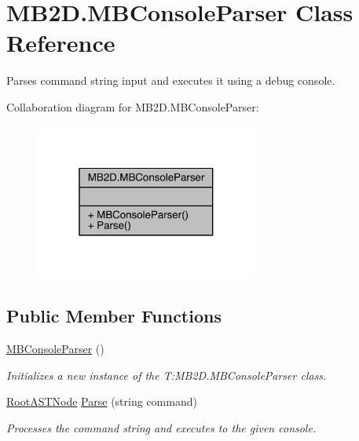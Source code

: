 \hypertarget{class_m_b2_d_1_1_m_b_console_parser}{}\section{M\+B2\+D.\+M\+B\+Console\+Parser Class Reference}
\label{class_m_b2_d_1_1_m_b_console_parser}


Parses command string input and executes it using a debug console.  




Collaboration diagram for M\+B2\+D.\+M\+B\+Console\+Parser\+:
\nopagebreak
\begin{figure}[H]
\begin{center}
\leavevmode
\includegraphics[width=208pt]{class_m_b2_d_1_1_m_b_console_parser__coll__graph}
\end{center}
\end{figure}
\subsection*{Public Member Functions}
\begin{DoxyCompactItemize}
\item 
\hyperlink{class_m_b2_d_1_1_m_b_console_parser_ad14d20f3d88fade887577eb105837008}{M\+B\+Console\+Parser} ()
\begin{DoxyCompactList}\small\item\em Initializes a new instance of the T\+:\+M\+B2\+D.\+M\+B\+Console\+Parser class. \end{DoxyCompactList}\item 
\hyperlink{class_m_b2_d_1_1_root_a_s_t_node}{Root\+A\+S\+T\+Node} \hyperlink{class_m_b2_d_1_1_m_b_console_parser_a880d5a9c56db05d19610df482b15bbf0}{Parse} (string command)
\begin{DoxyCompactList}\small\item\em Processes the command string and executes to the given console. \end{DoxyCompactList}\end{DoxyCompactItemize}


